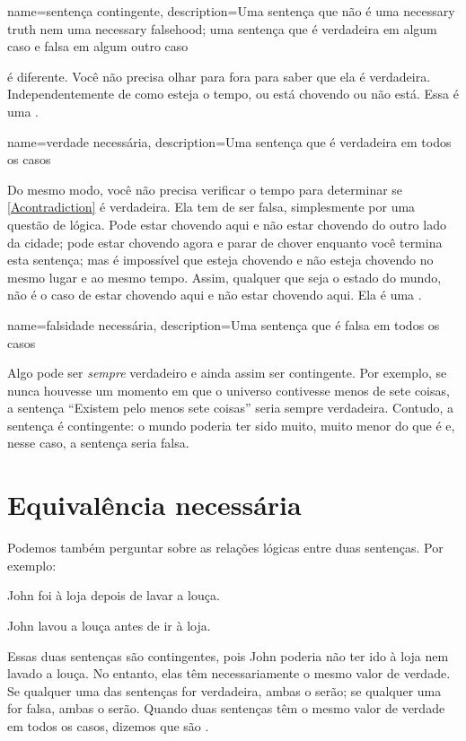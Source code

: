 {
name={sentença contingente},
description={Uma sentença que não é uma \gls{necessary truth} nem uma \gls{necessary falsehood}; uma sentença que é verdadeira em algum caso e falsa em algum outro caso}
}

 é diferente. Você não precisa olhar para fora para saber que ela é verdadeira. Independentemente de como esteja o tempo, ou está chovendo ou não está. Essa é uma .

{
name={verdade necessária},
description={Uma sentença que é verdadeira em todos os casos}
}

Do mesmo modo, você não precisa verificar o tempo para determinar se \cref*{Acontradiction} é verdadeira. Ela tem de ser falsa, simplesmente por uma questão de lógica. Pode estar chovendo aqui e não estar chovendo do outro lado da cidade; pode estar chovendo agora e parar de chover enquanto você termina esta sentença; mas é impossível que esteja chovendo e não esteja chovendo no mesmo lugar e ao mesmo tempo. Assim, qualquer que seja o estado do mundo, não é o caso de estar chovendo aqui e não estar chovendo aqui. Ela é uma .

{
name={falsidade necessária},
description={Uma sentença que é falsa em todos os casos}
}

Algo pode ser \emph{sempre} verdadeiro e ainda assim ser contingente. Por exemplo, se nunca houvesse um momento em que o universo contivesse menos de sete coisas, a sentença \textquotedblleft Existem pelo menos sete coisas\textquotedblright{} seria sempre verdadeira. Contudo, a sentença é contingente: o mundo poderia ter sido muito, muito menor do que é e, nesse caso, a sentença seria falsa.

\section{Equivalência necessária}

Podemos também perguntar sobre as relações lógicas entre duas sentenças. Por exemplo:
\begin{compactlist}
\item[] John foi à loja depois de lavar a louça.
\item[] John lavou a louça antes de ir à loja.
\end{compactlist}
Essas duas sentenças são contingentes, pois John poderia não ter ido à loja nem lavado a louça. No entanto, elas têm necessariamente o mesmo valor de verdade. Se qualquer uma das sentenças for verdadeira, ambas o serão; se qualquer uma for falsa, ambas o serão. Quando duas sentenças têm o mesmo valor de verdade em todos os casos, dizemos que são .

